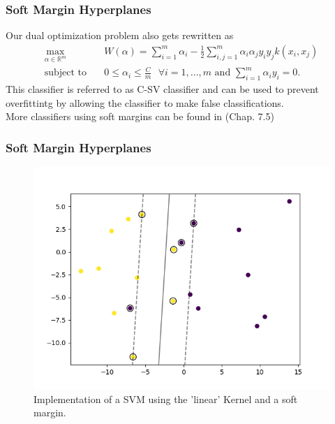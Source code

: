 \documentclass{beamer}
\begin{document}
\begin{frame}{}
	\frametitle{Soft Margin Hyperplanes}
	Our dual optimization problem also gets rewritten as
    \begin{equation} \label{eq:6}
	\begin{aligned}
		\max_{\alpha \in \mathbb{R}^m} \quad & W(\alpha) = \sum_{i=1}^{m} \alpha_i - \frac{1}{2} \sum_{i,j=1}^{m} \alpha_i \alpha_j y_i y_j k(x_i, x_j) \\
		\textrm{subject to} \quad & 0 \leq \alpha_i \leq \frac{C}{m} \text{ } \forall i = {1, \dots, m} \text{ and } \sum_{i=1}^{m} \alpha_i y_i = 0. 
	\end{aligned}
	\end{equation}
	This classifier is referred to as C-SV classifier and can be used to prevent overfittintg by allowing the classifier to make false classifications. \\
	More classifiers using soft margins can be found in \cite{Schoelkopf}(Chap. 7.5)
\end{frame}

\begin{frame}{}
	\frametitle{Soft Margin Hyperplanes}
	\begin{figure}
		\centering
		\includegraphics[width=0.7\linewidth]{img/SlackSVM}
		\caption{Implementation of a SVM using the 'linear' Kernel and a soft margin.}
		\label{fig:slackdata}
	\end{figure}
\end{frame}
\end{document}
